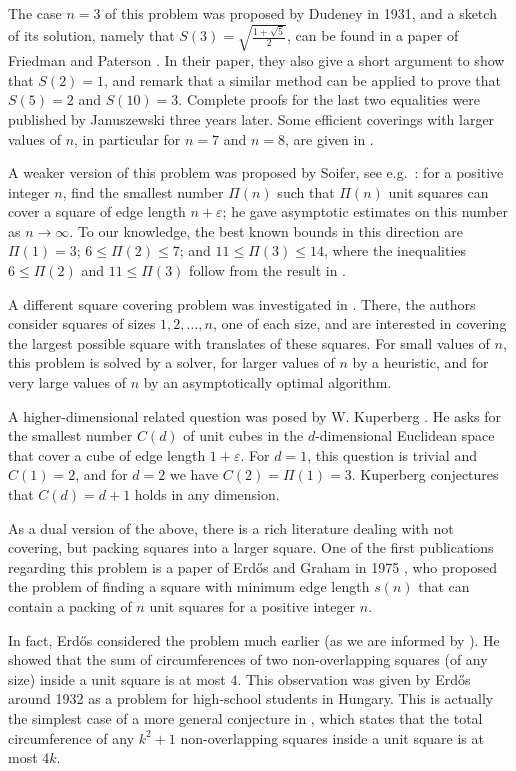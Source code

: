 \documentclass[twoside]{amsart}
\begin{document}
The case $n=3$ of this problem was proposed by Dudeney \cite{Dudeney} in 1931, 
and a sketch of its solution, namely that $S(3) = \sqrt{\frac{1+\sqrt{5}}{2}}$, can be found in a paper of Friedman and Paterson \cite{Friedcov}. In their paper, they also give a short argument to show that $S(2)=1$, and remark that a similar method can be applied to prove that $S(5)=2$ and $S(10)=3$.
Complete proofs for the last two equalities were published by Januszewski 
\cite{Janu09} three years later. Some efficient coverings with larger values of $n$, in particular for $n=7$ and $n=8$, are given in \cite{Friedcov}.

A weaker version of this problem was proposed by Soifer, see e.g.\ \cite{Soifer06}: for a positive integer $n$, find the smallest number $\Pi(n)$ such that $\Pi(n)$ unit squares can cover a square of edge length $n + \varepsilon$; he gave asymptotic estimates on this number as $n \to \infty$. To our knowledge, the best known bounds in this direction are $\Pi(1)=3$; $6\leq\Pi(2)\leq7$; and $11\leq\Pi(3)\leq 14$, where the inequalities $6\leq\Pi(2)$ and $11\leq\Pi(3)$ follow from the result in \cite{Janu09}. 

A different square covering problem was investigated in \cite{Balogh25}. There, the authors consider squares of sizes
$1,2,\dots,n$, one of each size, and are interested in covering the largest
possible square with translates of these squares. For small values of $n$, this problem is solved by a solver, for larger values of $n$ by a heuristic, and for very large values of $n$ by an asymptotically optimal algorithm.

A higher-dimensional related question was posed by W. Kuperberg \cite{Kuperberg}. He asks
for the smallest number $C(d)$ of unit cubes in the $d$-dimensional Euclidean space that cover a cube of edge length $1+\varepsilon$. For $d=1$, this question is trivial and $C(1)=2$, and for $d=2$ we have $C(2)=\Pi(1) = 3$.
Kuperberg conjectures that $C(d)=d+1$ holds in any dimension.

As a dual version of the above, there is a rich literature dealing with not covering,
but packing squares into a larger square. One of the first publications
regarding this problem is a paper of Erd\H{o}s and Graham in 1975 \cite{EG75}, who proposed the problem of finding a square with minimum edge length $s(n)$ that can contain a packing of $n$ unit squares for a positive integer $n$.

In fact, Erd\H{o}s considered the problem much earlier (as we are informed by
\cite{Praton}). 
He showed that the sum of
circumferences of two non-overlapping squares
(of any size) inside a unit square is at most $4$. This observation was given by Erd\H{o}s around
1932 as a problem for high-school students in Hungary.
This is actually the
simplest case of a more general conjecture in \cite{EG75}, which states that
the total circumference
of any $k^{2}+1$ non-overlapping squares inside a unit square is at most $4k$.
\end{document}

